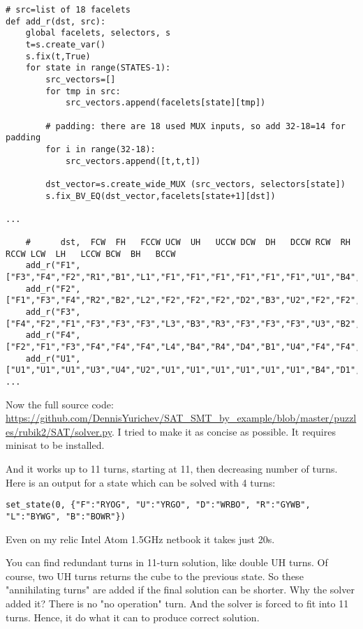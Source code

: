 \begin{lstlisting}
# src=list of 18 facelets
def add_r(dst, src):
    global facelets, selectors, s
    t=s.create_var()
    s.fix(t,True)
    for state in range(STATES-1):
        src_vectors=[]
        for tmp in src:
            src_vectors.append(facelets[state][tmp])

        # padding: there are 18 used MUX inputs, so add 32-18=14 for padding
        for i in range(32-18): 
            src_vectors.append([t,t,t])

        dst_vector=s.create_wide_MUX (src_vectors, selectors[state])
        s.fix_BV_EQ(dst_vector,facelets[state+1][dst])

...

    #      dst,  FCW  FH   FCCW UCW  UH   UCCW DCW  DH   DCCW RCW  RH   RCCW LCW  LH   LCCW BCW  BH   BCCW
    add_r("F1",["F3","F4","F2","R1","B1","L1","F1","F1","F1","F1","F1","F1","U1","B4","D1","F1","F1","F1"])
    add_r("F2",["F1","F3","F4","R2","B2","L2","F2","F2","F2","D2","B3","U2","F2","F2","F2","F2","F2","F2"])
    add_r("F3",["F4","F2","F1","F3","F3","F3","L3","B3","R3","F3","F3","F3","U3","B2","D3","F3","F3","F3"])
    add_r("F4",["F2","F1","F3","F4","F4","F4","L4","B4","R4","D4","B1","U4","F4","F4","F4","F4","F4","F4"])
    add_r("U1",["U1","U1","U1","U3","U4","U2","U1","U1","U1","U1","U1","U1","B4","D1","F1","R2","D4","L3"])
...
\end{lstlisting}

Now the full source code: \url{https://github.com/DennisYurichev/SAT_SMT_by_example/blob/master/puzzles/rubik2/SAT/solver.py}.
I tried to make it as concise as possible.
It requires minisat to be installed.

And it works up to 11 turns, starting at 11, then decreasing number of turns.
Here is an output for a state which can be solved with 4 turns:

\begin{lstlisting}
set_state(0, {"F":"RYOG", "U":"YRGO", "D":"WRBO", "R":"GYWB", "L":"BYWG", "B":"BOWR"})
\end{lstlisting}



Even on my relic Intel Atom 1.5GHz netbook it takes just 20s.

You can find redundant turns in 11-turn solution, like double UH turns.
Of course, two UH turns returns the cube to the previous state.
So these "annihilating turns" are added if the final solution can be shorter.
Why the solver added it? There is no "no operation" turn. And the solver is forced to fit into 11 turns.
Hence, it do what it can to produce correct solution.

